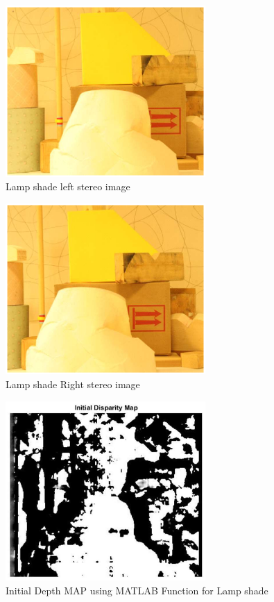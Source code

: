 \begin{figure}[h]
\begin{center}
\includegraphics[width=3in]{leftlam.eps}
\caption{Lamp shade left stereo image} \label{lined}
\end{center}
\end{figure}
\begin{figure}[h]
\begin{center}
\includegraphics[width=3in]{rightlam.eps}
\caption{Lamp shade Right stereo image} \label{lined}
\end{center}
\end{figure}
\begin{figure}[h]
\begin{center}
\includegraphics[width=3in]{idmlamma.eps}
\caption{Initial Depth MAP using MATLAB Function for Lamp shade } \label{lined}
\end{center}
\end{figure}
